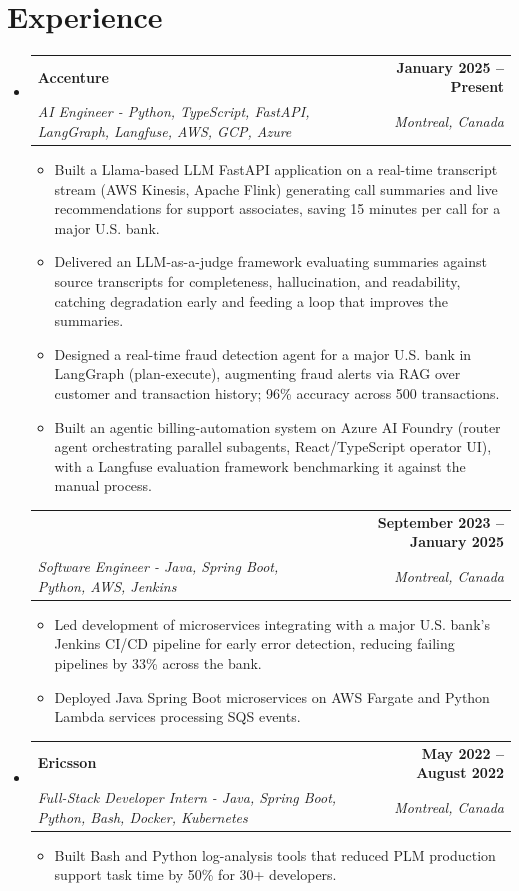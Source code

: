 \documentclass[letterpaper,11pt]{article}
\makeatletter
\newcommand{\resumeItem}[1]{
  \item\small{{#1 \vspace{-2pt}}}
}
\newcommand{\resumeSubheading}[4]{
  \vspace{-2pt}\item
    \begin{tabular*}{1.0\textwidth}[t]{l@{\extracolsep{\fill}}r}
      \textbf{#1} & \textbf{\small #2} \\
      \textit{\small#3} & \textit{\small #4} \\
    \end{tabular*}\vspace{-7pt}
}
\newcommand{\resumeSubheadingContinued}[3]{
  \vspace{4pt}
    \begin{tabular*}{1.0\textwidth}[t]{l@{\extracolsep{\fill}}r}
      & \textbf{\small #2} \\
      \textit{\small#1} & \textit{\small #3} \\
    \end{tabular*}\vspace{-7pt}
}
\newcommand{\resumeSubHeadingListStart}{\begin{itemize}[leftmargin=0.0in, label={}]}
\newcommand{\resumeSubHeadingListEnd}{\end{itemize}}
\newcommand{\resumeItemListStart}{\begin{itemize}}
\newcommand{\resumeItemListEnd}{\end{itemize}\vspace{-5pt}}
\makeatother
\begin{document}
\section{Experience}
  \resumeSubHeadingListStart

    \resumeSubheading
      {Accenture}{January 2025 -- Present}
      {AI Engineer - Python, TypeScript, FastAPI, LangGraph, Langfuse, AWS, GCP, Azure}{Montreal, Canada}
      \resumeItemListStart
        \resumeItem{Built a Llama-based LLM FastAPI application on a real-time transcript stream (AWS Kinesis, Apache Flink) generating call summaries and live recommendations for support associates, saving 15 minutes per call for a major U.S. bank.}
        \resumeItem{Delivered an LLM-as-a-judge framework evaluating summaries against source transcripts for completeness, hallucination, and readability, catching degradation early and feeding a loop that improves the summaries.}
        \resumeItem{Designed a real-time fraud detection agent for a major U.S. bank in LangGraph (plan-execute), augmenting fraud alerts via RAG over customer and transaction history; 96\% accuracy across 500 transactions.}
        \resumeItem{Built an agentic billing-automation system on Azure AI Foundry (router agent orchestrating parallel subagents, React/TypeScript operator UI), with a Langfuse evaluation framework benchmarking it against the manual process.}
      \resumeItemListEnd
      \vspace{-5pt}

    \resumeSubheadingContinued
      {Software Engineer - Java, Spring Boot, Python, AWS, Jenkins}{September 2023 -- January 2025}{Montreal, Canada}
      \resumeItemListStart
        \resumeItem{Led development of microservices integrating with a major U.S. bank's Jenkins CI/CD pipeline for early error detection, reducing failing pipelines by 33\% across the bank.}
        \resumeItem{Deployed Java Spring Boot microservices on AWS Fargate and Python Lambda services processing SQS events.}
      \resumeItemListEnd

    \resumeSubheading
      {Ericsson}{May 2022 -- August 2022}
      {Full-Stack Developer Intern - Java, Spring Boot, Python, Bash, Docker, Kubernetes}{Montreal, Canada}
      \resumeItemListStart
        \resumeItem{Built Bash and Python log-analysis tools that reduced PLM production support task time by 50\% for 30+ developers.}
      \resumeItemListEnd

  \resumeSubHeadingListEnd
\vspace{-14pt}
\end{document}
